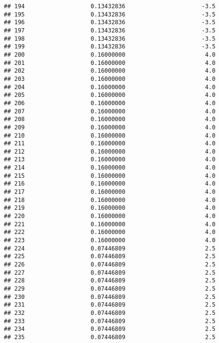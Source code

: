\documentclass[]{article}
\begin{document}
\begin{verbatim}
## 194                   0.13432836                      -3.5
## 195                   0.13432836                      -3.5
## 196                   0.13432836                      -3.5
## 197                   0.13432836                      -3.5
## 198                   0.13432836                      -3.5
## 199                   0.13432836                      -3.5
## 200                   0.16000000                       4.0
## 201                   0.16000000                       4.0
## 202                   0.16000000                       4.0
## 203                   0.16000000                       4.0
## 204                   0.16000000                       4.0
## 205                   0.16000000                       4.0
## 206                   0.16000000                       4.0
## 207                   0.16000000                       4.0
## 208                   0.16000000                       4.0
## 209                   0.16000000                       4.0
## 210                   0.16000000                       4.0
## 211                   0.16000000                       4.0
## 212                   0.16000000                       4.0
## 213                   0.16000000                       4.0
## 214                   0.16000000                       4.0
## 215                   0.16000000                       4.0
## 216                   0.16000000                       4.0
## 217                   0.16000000                       4.0
## 218                   0.16000000                       4.0
## 219                   0.16000000                       4.0
## 220                   0.16000000                       4.0
## 221                   0.16000000                       4.0
## 222                   0.16000000                       4.0
## 223                   0.16000000                       4.0
## 224                   0.07446809                       2.5
## 225                   0.07446809                       2.5
## 226                   0.07446809                       2.5
## 227                   0.07446809                       2.5
## 228                   0.07446809                       2.5
## 229                   0.07446809                       2.5
## 230                   0.07446809                       2.5
## 231                   0.07446809                       2.5
## 232                   0.07446809                       2.5
## 233                   0.07446809                       2.5
## 234                   0.07446809                       2.5
## 235                   0.07446809                       2.5

\end{verbatim}
\end{document}
